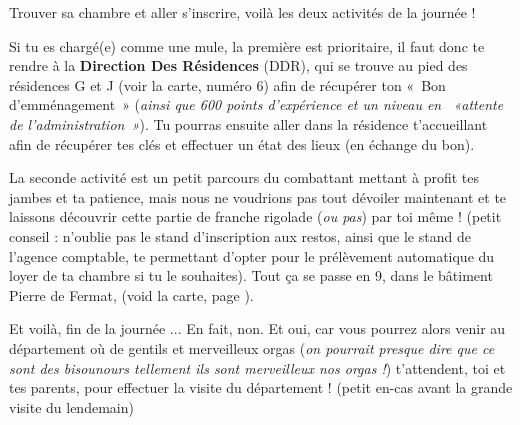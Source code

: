 Trouver sa chambre et aller s'inscrire, voilà les deux activités de la journée !

Si tu es chargé(e) comme une mule, la première est prioritaire, il faut donc te
rendre à la \textbf{Direction Des Résidences} (DDR), qui se trouve au pied des résidences
G et J (voir la carte, numéro 6) afin de récupérer ton «~Bon d'emménagement~» (\emph{ainsi que 600 points
d'expérience et un niveau en ~«attente de l'administration~»}).
Tu pourras ensuite aller dans la résidence t'accueillant afin de récupérer tes
clés et effectuer un état des lieux (en échange du bon).

La seconde activité est un petit parcours du combattant mettant à profit tes 
jambes et ta patience, mais nous ne voudrions pas tout dévoiler maintenant et
te laissons découvrir cette partie de franche rigolade (\emph{ou pas}) par toi même !
(petit conseil : n'oublie pas le stand d'inscription aux restos, ainsi que le
 stand de l'agence comptable, te permettant d'opter pour le prélèvement
 automatique du loyer de ta chambre si tu le souhaites). Tout ça se passe en 9,
dans le bâtiment Pierre de Fermat, (void la carte, page \pageref{plan}).

Et voilà, fin de la journée ... En fait, non.
Et oui, car vous pourrez alors venir au département où de gentils et merveilleux
orgas (\emph{on pourrait presque dire que ce sont des bisounours tellement ils sont
merveilleux nos orgas !}) t'attendent, toi et tes parents, pour effectuer
la visite du département ! (petit en-cas avant la grande visite du lendemain) 
